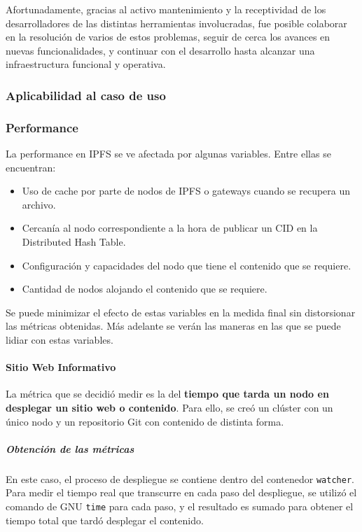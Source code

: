 Afortunadamente, gracias al activo mantenimiento y la receptividad de los desarrolladores de las distintas herramientas involucradas, fue posible colaborar en la resolución de varios de estos problemas, seguir de cerca los avances en nuevas funcionalidades, y continuar con el desarrollo hasta alcanzar una infraestructura funcional y operativa.

\subsubsection{Aplicabilidad al caso de uso}

\subsubsection{Performance}

La performance en IPFS se ve afectada por algunas variables. Entre ellas se encuentran:

\begin{itemize}
    \item Uso de cache por parte de nodos de IPFS o gateways cuando se recupera un archivo.
    \item Cercanía al nodo correspondiente a la hora de publicar un CID en la Distributed Hash Table.
    \item Configuración y capacidades del nodo que tiene el contenido que se requiere.
    \item Cantidad de nodos alojando el contenido que se requiere.
\end{itemize}

 Se puede minimizar  el efecto de estas variables en la medida final sin distorsionar las métricas obtenidas. Más adelante se verán las maneras en las que se puede lidiar con estas variables.

\paragraph{Sitio Web Informativo}
La métrica que se decidió medir es la del \textbf{tiempo que tarda un nodo en desplegar un sitio web o contenido}. Para ello, se creó un clúster con un único nodo y un repositorio Git con contenido de distinta forma.

\subparagraph{Obtención de las métricas} En este caso, el proceso de despliegue se contiene dentro del contenedor \texttt{watcher}. Para medir el tiempo real que transcurre en cada paso del despliegue, se utilizó el comando de GNU \texttt{time} para cada paso, y el resultado es sumado para obtener el tiempo total que tardó desplegar el contenido.

